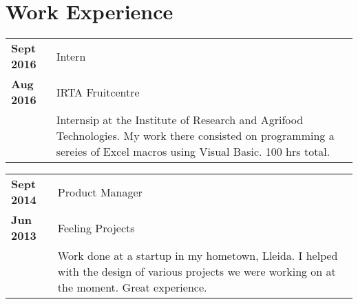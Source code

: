 \section{Work Experience}
\begin{center}

\begin{tabular}{>{\bfseries \hfill} p{2cm} | p{12cm}}
	Sept 2016	& Intern 	\\
	Aug 2016	& IRTA Fruitcentre\\
	~		& Internsip at the Institute of Research and Agrifood Technologies. My work there consisted on programming a sereies of Excel macros using Visual Basic. 100 hrs total. \\
\end{tabular}

\vspace{5mm}

\begin{tabular}{>{\bfseries \hfill} p{2cm} | p{12cm}}
	Sept 2014	& Product Manager 	\\
	Jun 2013	& Feeling Projects 	\\
	~		& Work done at a startup in my hometown, Lleida. I helped with the design of various projects we were working on at the moment. Great experience. \\
\end{tabular}

\end{center}
